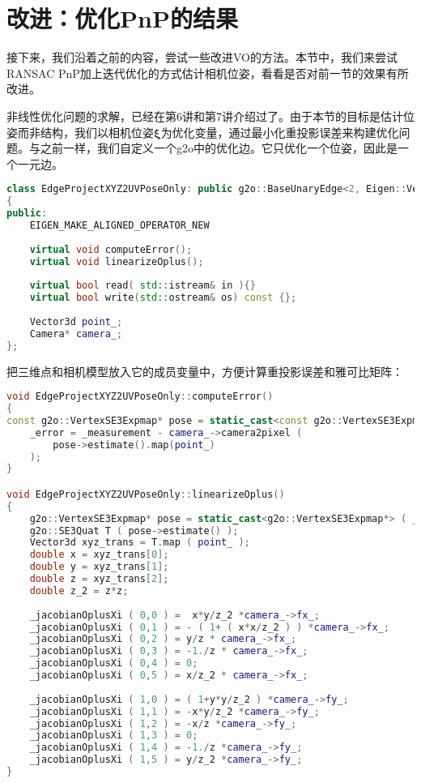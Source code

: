 \section{改进：优化PnP的结果}
接下来，我们沿着之前的内容，尝试一些改进VO的方法。本节中，我们来尝试RANSAC PnP加上迭代优化的方式估计相机位姿，看看是否对前一节的效果有所改进。

\clearpage
非线性优化问题的求解，已经在第6讲和第7讲介绍过了。由于本节的目标是估计位姿而非结构，我们以相机位姿$\bm{\xi}$为优化变量，通过最小化重投影误差来构建优化问题。与之前一样，我们自定义一个g2o中的优化边。它只优化一个位姿，因此是一个一元边。

\begin{lstlisting}[language=c++,caption=slambook/project/0.3/include/myslam/g2o\_types.h]
class EdgeProjectXYZ2UVPoseOnly: public g2o::BaseUnaryEdge<2, Eigen::Vector2d, g2o::VertexSE3Expmap >
{
public:
	EIGEN_MAKE_ALIGNED_OPERATOR_NEW
	
	virtual void computeError();
	virtual void linearizeOplus();
	
	virtual bool read( std::istream& in ){}
	virtual bool write(std::ostream& os) const {};
	
	Vector3d point_;
	Camera* camera_;
};
\end{lstlisting}

把三维点和相机模型放入它的成员变量中，方便计算重投影误差和雅可比矩阵：

\begin{lstlisting}[language=c++,caption=slambook/project/0.3/src/g2o\_types.cpp]
void EdgeProjectXYZ2UVPoseOnly::computeError()
{
const g2o::VertexSE3Expmap* pose = static_cast<const g2o::VertexSE3Expmap*> ( _vertices[0] );
	_error = _measurement - camera_->camera2pixel ( 
		pose->estimate().map(point_) 
	);
}

void EdgeProjectXYZ2UVPoseOnly::linearizeOplus()
{
	g2o::VertexSE3Expmap* pose = static_cast<g2o::VertexSE3Expmap*> ( _vertices[0] );
	g2o::SE3Quat T ( pose->estimate() );
	Vector3d xyz_trans = T.map ( point_ );
	double x = xyz_trans[0];
	double y = xyz_trans[1];
	double z = xyz_trans[2];
	double z_2 = z*z;
	
	_jacobianOplusXi ( 0,0 ) =  x*y/z_2 *camera_->fx_;
	_jacobianOplusXi ( 0,1 ) = - ( 1+ ( x*x/z_2 ) ) *camera_->fx_;
	_jacobianOplusXi ( 0,2 ) = y/z * camera_->fx_;
	_jacobianOplusXi ( 0,3 ) = -1./z * camera_->fx_;
	_jacobianOplusXi ( 0,4 ) = 0;
	_jacobianOplusXi ( 0,5 ) = x/z_2 * camera_->fx_;
	
	_jacobianOplusXi ( 1,0 ) = ( 1+y*y/z_2 ) *camera_->fy_;
	_jacobianOplusXi ( 1,1 ) = -x*y/z_2 *camera_->fy_;
	_jacobianOplusXi ( 1,2 ) = -x/z *camera_->fy_;
	_jacobianOplusXi ( 1,3 ) = 0;
	_jacobianOplusXi ( 1,4 ) = -1./z *camera_->fy_;
	_jacobianOplusXi ( 1,5 ) = y/z_2 *camera_->fy_;
}
\end{lstlisting}

